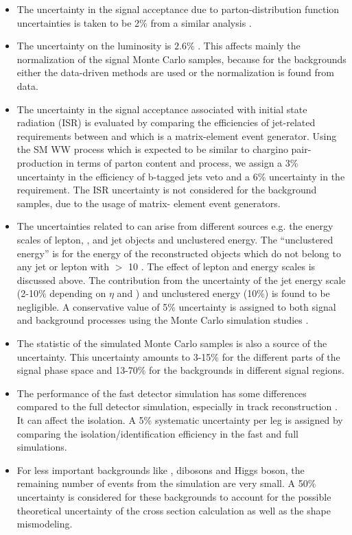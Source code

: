 \begin{itemize}
\item The uncertainty in the signal acceptance due to parton-distribution function uncertainties 
  is taken to be 2\% from a similar analysis \cite{Khachatryan:2014qwa}.

\item The uncertainty on the luminosity  is $2.6\%$ \cite{CMS-PAS-LUM-13-001}.  This affects mainly the
  normalization of the signal Monte Carlo samples, because for the backgrounds  either  the data-driven methods are used or 
the normalization is found from data.

\item The uncertainty in the signal acceptance associated with initial state radiation (ISR)
is evaluated by comparing the efficiencies of jet-related requirements between \PYTHIA
 and \MADGRAPH which is a matrix-element event generator. Using the SM WW process which
 is expected to be similar to chargino pair-production in terms of parton content and process, we assign a 3\% uncertainty in 
the efficiency of  b-tagged jets veto and a 6\% uncertainty in the \deltaphi requirement. The ISR
 uncertainty is not considered for the background samples, due to the usage of matrix-
 element event generators.

\item The uncertainties related to \MPT can arise from different sources e.g.  the energy scales of lepton, \Tau, and jet
objects and unclustered energy.  The ``unclustered energy'' is for the energy of the reconstructed objects which
 do not belong to any jet or lepton with \PT $>$ 10 \GeV. The effect of lepton and \Tau
 energy scales is discussed above. The contribution from the uncertainty of the jet energy scale (2-10\% depending on $\eta$  and \PT) and
 unclustered energy (10\%) is found to be negligible. A conservative value of 5\% uncertainty
 is assigned to both signal and background processes using the Monte
 Carlo simulation studies \cite{Khachatryan:2015kxa, Khachatryan:2014qwa}.

\item The statistic of the simulated Monte Carlo samples is also a
  source of the  uncertainty. %
This uncertainty amounts to 3-15\% for the different parts of the signal phase space and 13-70\% for the backgrounds in different signal regions.

\item The performance of the fast detector simulation has some differences compared to the full detector simulation, especially in
 track reconstruction \cite{Khachatryan:2015kxa}. It can affect the \Tau isolation. A 5\% systematic uncertainty per
 \Tau leg is assigned by comparing the \Tau isolation/identification efficiency in the fast
 and full simulations. 


\item For less important backgrounds like \ttbar,  dibosons and Higgs boson, the remaining number of
events from the simulation are very small. A 50\% uncertainty is considered for these backgrounds to account for the possible theoretical uncertainty of the
cross section calculation as well as the shape mismodeling.
\end{itemize}



